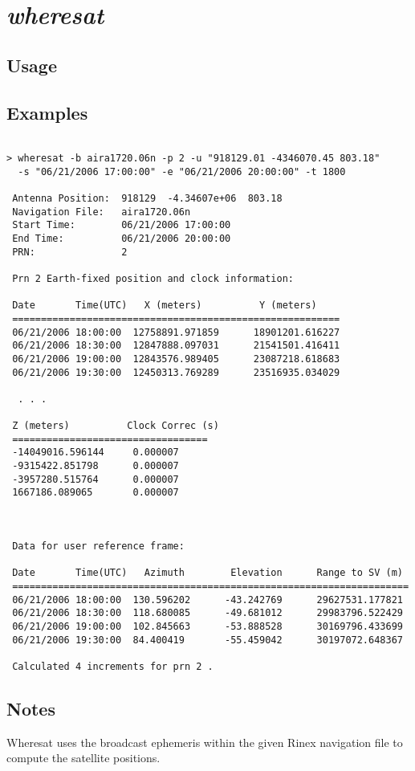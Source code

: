 \section{\emph{wheresat}}
\subsection{Usage}
\subsection{Examples}
\begin{verbatim}

> wheresat -b aira1720.06n -p 2 -u "918129.01 -4346070.45 803.18" 
  -s "06/21/2006 17:00:00" -e "06/21/2006 20:00:00" -t 1800 

 Antenna Position:  918129  -4.34607e+06  803.18
 Navigation File:   aira1720.06n
 Start Time:        06/21/2006 17:00:00
 End Time:          06/21/2006 20:00:00
 PRN:               2

 Prn 2 Earth-fixed position and clock information:

 Date       Time(UTC)   X (meters)          Y (meters)
 =========================================================
 06/21/2006 18:00:00  12758891.971859      18901201.616227
 06/21/2006 18:30:00  12847888.097031      21541501.416411
 06/21/2006 19:00:00  12843576.989405      23087218.618683
 06/21/2006 19:30:00  12450313.769289      23516935.034029

  . . .

 Z (meters)          Clock Correc (s)
 ==================================
 -14049016.596144     0.000007
 -9315422.851798      0.000007
 -3957280.515764      0.000007
 1667186.089065       0.000007



 Data for user reference frame:

 Date       Time(UTC)   Azimuth        Elevation      Range to SV (m)
 =====================================================================
 06/21/2006 18:00:00  130.596202      -43.242769      29627531.177821
 06/21/2006 18:30:00  118.680085      -49.681012      29983796.522429
 06/21/2006 19:00:00  102.845663      -53.888528      30169796.433699
 06/21/2006 19:30:00  84.400419       -55.459042      30197072.648367

 Calculated 4 increments for prn 2 .

\end{verbatim}
\subsection{Notes}
Wheresat uses the broadcast ephemeris within the given Rinex navigation file to compute the satellite positions.
